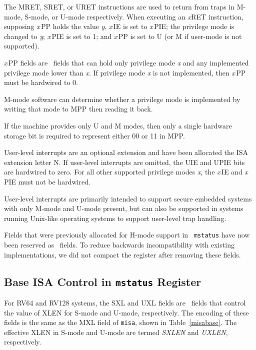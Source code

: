 The MRET, SRET, or URET instructions are used to return from
traps in M-mode, S-mode, or U-mode respectively.  When
executing an {\em x}RET instruction, supposing {\em x}\,PP holds the
value {\em y}, {\em x}\,IE is set to {\em x}\,PIE; the privilege mode
is changed to {\em y}; {\em x}\,PIE is set to 1; and {\em x}\,PP is
set to U (or M if user-mode is not supported).

{\em x}\,PP fields are \warl\ fields that can hold only privilege mode {\em x}
and any implemented privilege mode lower than {\em x}.  If privilege mode {\em
x} is not implemented, then {\em x}\,PP must be hardwired to 0.

\begin{commentary}
M-mode software can determine whether a privilege mode is implemented
by writing that mode to MPP then reading it back.

If the machine provides only U and M modes, then only a single
hardware storage bit is required to represent either 00 or 11 in MPP.
\end{commentary}

User-level interrupts are an optional extension and have been
allocated the ISA extension letter N.
If user-level interrupts are omitted, the
UIE and UPIE bits are hardwired to zero.  For all other supported
privilege modes {\em x}, the {\em x}\,IE and {\em x}\,PIE must not
be hardwired.

\begin{commentary}
User-level interrupts are primarily intended to support secure
embedded systems with only M-mode and U-mode present, but can also be
supported in systems running Unix-like operating systems to support
user-level trap handling.
\end{commentary}

\begin{commentary}
Fields that were previously allocated for H-mode support in {\tt
  mstatus} have now been reserved as \wpri\ fields.  To reduce
backwards incompatibility with existing implementations, we did not
compact the register after removing these fields.
\end{commentary}

\subsection{Base ISA Control in {\tt mstatus} Register}
\label{xlen-control}

For RV64 and RV128 systems, the SXL and UXL fields are \warl\ fields
that control the value of XLEN for S-mode and U-mode,
respectively. The encoding of these fields is the same as the MXL
field of {\tt misa}, shown in Table~\ref{misabase}.  The effective
XLEN in S-mode and U-mode are termed {\em SXLEN} and {\em UXLEN},
respectively.

